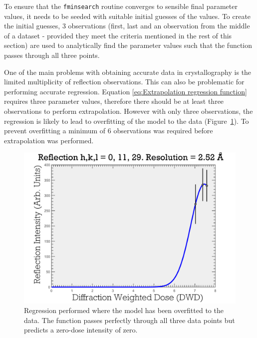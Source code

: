 To ensure that the \verb|fminsearch| routine converges to sensible final parameter values, it needs to be seeded with suitable initial guesses of the values. To create the initial guesses, 3 observations (first, last and an observation from the middle of a dataset - provided they meet the criteria mentioned in the rest of this section) are used to analytically find the parameter values such that the function passes through all three points.

One of the main problems with obtaining accurate data in crystallography is the limited multiplicity of reflection observations.
This can also be problematic for performing accurate regression.
Equation \ref{eq:Extrapolation regression function} requires three parameter values, therefore there should be at least three observations to perform extrapolation.
However with only three observations, the regression is likely to lead to overfitting of the model to the data (Figure~\ref{fig:Data Overfitting to few data points - Extrapolation method}).
To prevent overfitting a minimum of 6 observations was required before extrapolation was performed.
\begin{figure}
  \centering
    \includegraphics[width=1\textwidth]{figures/zde/ReflectionPlot_h,k,l_0,11,29-3obs.pdf}
    \caption{Regression performed where the model has been overfitted to the data.
    The function passes perfectly through all three data points but predicts a zero-dose intensity of zero.}
    \label{fig:Data Overfitting to few data points - Extrapolation method}
\end{figure}

